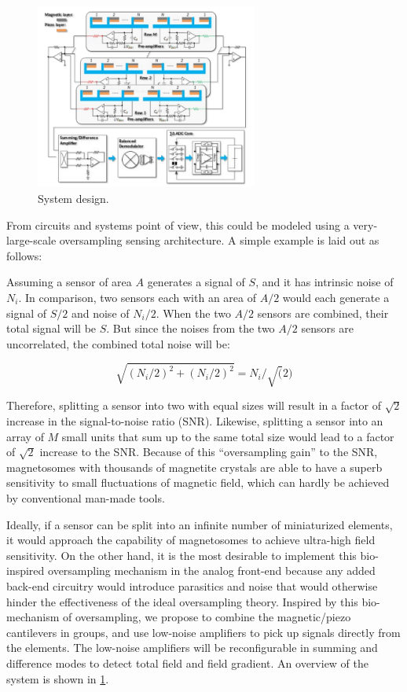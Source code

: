 \begin{figure}
\centering
\includegraphics[width=0.65\textwidth]{system}
\caption{System design.}
\label{fig:system}
\end{figure}

From circuits and systems point of view, this could be modeled using a very-large-scale oversampling sensing architecture. A simple example is laid out as follows: 

Assuming a sensor of area $A$ generates a signal of $S$, and it has intrinsic noise of $N_i$. In comparison, two sensors each with an area of $A/2$ would each generate a signal of $S/2$ and noise of $N_i/2$. When the two $A/2$ sensors are combined, their total signal will be $S$. But since the noises from the two $A/2$ sensors are uncorrelated, the combined total noise will be:

$$\sqrt{(N_i/2)^2+(N_i/2)^2} = N_i/\sqrt(2) $$

Therefore, splitting a sensor into two with equal sizes will result in a factor of $\sqrt{2}$ increase in the signal-to-noise ratio (SNR). Likewise, splitting a sensor into an array of $M$ small units that sum up to the same total size would lead to a factor of $\sqrt{2}$ increase to the SNR. Because of this “oversampling gain” to the SNR, magnetosomes with thousands of magnetite crystals are able to have a superb sensitivity to small fluctuations of magnetic field, which can hardly be achieved by conventional man-made tools. 

Ideally, if a sensor can be split into an infinite number of miniaturized elements, it would approach the capability of magnetosomes to achieve ultra-high field sensitivity. On the other hand, it is the most desirable to implement this bio-inspired oversampling mechanism in the analog front-end because any added back-end circuitry would introduce parasitics and noise that would otherwise hinder the effectiveness of the ideal oversampling theory. Inspired by this bio-mechanism of oversampling, we propose to combine the magnetic/piezo cantilevers in groups, and use low-noise amplifiers to pick up signals directly from the elements. The low-noise amplifiers will be reconfigurable in summing and difference modes to detect total field and field gradient. An overview of the system is shown in \ref{fig:system}.

